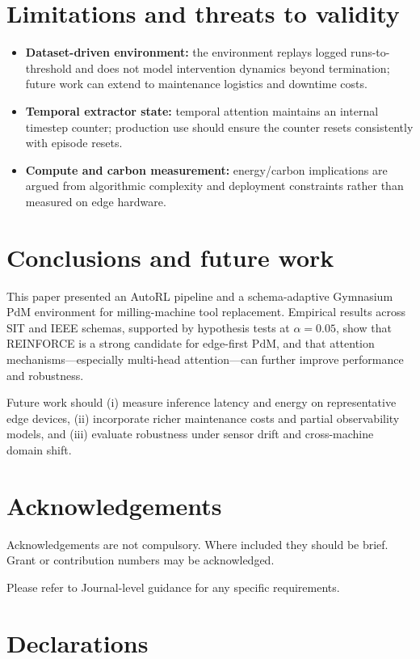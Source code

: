 \documentclass[refree,sn-basic]{sn-jnl} %
\begin{document}
\section{Limitations and threats to validity}
\label{sec:limits}
\begin{itemize}
        \item \textbf{Dataset-driven environment:} the environment replays logged runs-to-threshold and does not model intervention dynamics beyond termination; future work can extend to maintenance logistics and downtime costs.
        \item \textbf{Temporal extractor state:} temporal attention maintains an internal timestep counter; production use should ensure the counter resets consistently with episode resets.
        \item \textbf{Compute and carbon measurement:} energy/carbon implications are argued from algorithmic complexity and deployment constraints rather than measured on edge hardware.
\end{itemize}

\section{Conclusions and future work}
\label{sec:conclusion}
This paper presented an AutoRL pipeline and a schema-adaptive Gymnasium PdM environment for milling-machine tool replacement. Empirical results across SIT and IEEE schemas, supported by hypothesis tests at $\alpha=0.05$, show that REINFORCE is a strong candidate for edge-first PdM, and that attention mechanisms---especially multi-head attention---can further improve performance and robustness.

Future work should (i) measure inference latency and energy on representative edge devices, (ii) incorporate richer maintenance costs and partial observability models, and (iii) evaluate robustness under sensor drift and cross-machine domain shift.



\section*{Acknowledgements}

Acknowledgements are not compulsory. Where included they should be brief. Grant or contribution numbers may be acknowledged.

Please refer to Journal-level guidance for any specific requirements.

\section*{Declarations}
\end{document}
